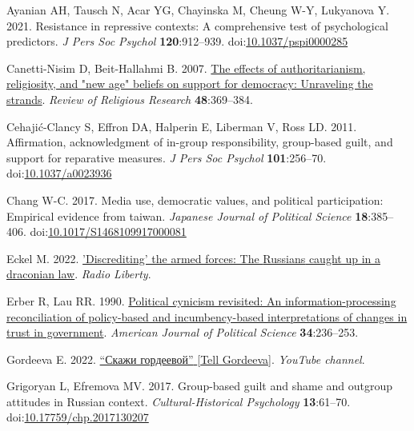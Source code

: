 \documentclass[
]{article}
\newlength{\cslhangindent}
\newenvironment{CSLReferences}[2] %
 {\begin{list}{}{%
  \setlength{\itemindent}{0pt}
  \setlength{\leftmargin}{0pt}
  \setlength{\parsep}{0pt}
  \ifodd #1
   \setlength{\leftmargin}{\cslhangindent}
   \setlength{\itemindent}{-1\cslhangindent}
  \fi
  \setlength{\itemsep}{#2\baselineskip}}}
 {\end{list}}
\begin{document}
\begin{CSLReferences}{1}{0}
Ayanian AH, Tausch N, Acar YG, Chayinska M, Cheung W-Y, Lukyanova Y. 2021. Resistance in repressive contexts: A comprehensive test of psychological predictors. \emph{J Pers Soc Psychol} \textbf{120}:912--939. doi:\href{https://doi.org/10.1037/pspi0000285}{10.1037/pspi0000285}

Canetti-Nisim D, Beit-Hallahmi B. 2007. \href{http://www.jstor.org/stable/20447457}{The effects of authoritarianism, religiosity, and "new age" beliefs on support for democracy: Unraveling the strands}. \emph{Review of Religious Research} \textbf{48}:369--384.

Cehajić-Clancy S, Effron DA, Halperin E, Liberman V, Ross LD. 2011. Affirmation, acknowledgment of in-group responsibility, group-based guilt, and support for reparative measures. \emph{J Pers Soc Psychol} \textbf{101}:256--70. doi:\href{https://doi.org/10.1037/a0023936}{10.1037/a0023936}

Chang W-C. 2017. Media use, democratic values, and political participation: Empirical evidence from taiwan. \emph{Japanese Journal of Political Science} \textbf{18}:385--406. doi:\href{https://doi.org/10.1017/S1468109917000081}{10.1017/S1468109917000081}

Eckel M. 2022. \href{https://www.rferl.org/a/russia-ukraine-war-discrediting-armed-forces-law/31875273.html}{'Discrediting' the armed forces: The {Russians} caught up in a draconian law}. \emph{Radio Liberty}.

Erber R, Lau RR. 1990. \href{http://www.jstor.org/stable/2111517}{Political cynicism revisited: An information-processing reconciliation of policy-based and incumbency-based interpretations of changes in trust in government}. \emph{American Journal of Political Science} \textbf{34}:236--253.

Gordeeva E. 2022. \href{https://www.youtube.com/@skazhigordeevoy}{{``Скажи гордеевой''} {{[}Tell Gordeeva{]}}}. \emph{YouTube channel}.

Grigoryan L, Efremova MV. 2017. Group-based guilt and shame and outgroup attitudes in {Russian} context. \emph{Cultural-Historical Psychology} \textbf{13}:61--70. doi:\href{https://doi.org/10.17759/chp.2017130207}{10.17759/chp.2017130207}


\end{CSLReferences}
\end{document}
